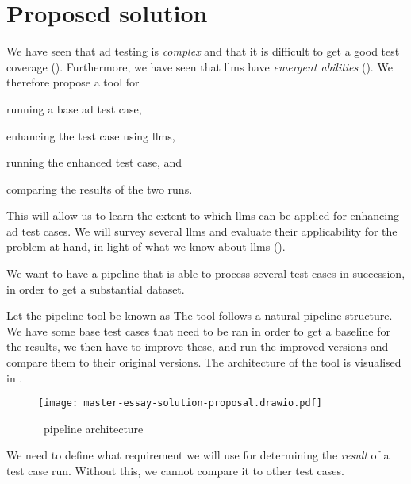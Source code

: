 \section{Proposed solution}\label{sec:solutionProposal}

We have seen that \acrshort{ad} testing is \textit{complex} and that it is difficult to get a good
test coverage (). Furthermore, we have seen that \acrshort{llms} have
\textit{emergent abilities} (). We therefore propose a tool for
\begin{inparaenum}
    \item running a base \acrshort{ad} test case,
    \item enhancing the test case using \acrshort{llms},
    \item running the enhanced test case,
    and
    \item comparing the results of the two runs.
\end{inparaenum}

This will allow us to learn the extent to which \acrshort{llms} can be applied for enhancing
\acrlong{ad} test cases. We will survey several \acrshort{llms} and evaluate their applicability for
the problem at hand, in light of what we know about \acrshort{llms} ().

We want to have a pipeline that is able to process several test cases in succession, in order to get
a substantial dataset.

Let the pipeline tool be known as \hefe%
The tool follows a natural pipeline structure. We have some base test cases that
need to be ran in order to get a baseline for the results, we then have to
improve these, and run the improved versions and compare them to their original
versions. The architecture of the tool is visualised in .

\begin{figure}[h]
    \centering
    \texttt{[image: master-essay-solution-proposal.drawio.pdf]}
    \caption{\hefe~pipeline architecture}\label{fig:hefeArch}
\end{figure}

We need to define what requirement we will use for determining the \textit{result} of a test case
run. Without this, we cannot compare it to other test cases.

